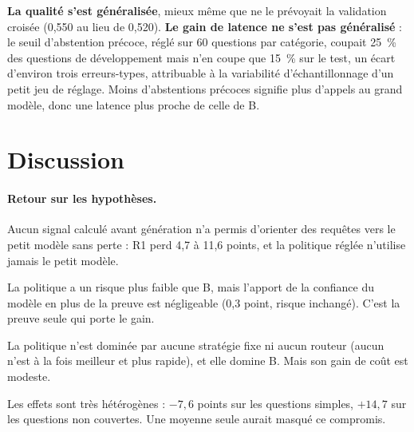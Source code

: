 \documentclass[11pt,a4paper]{article}
\begin{document}
\textbf{La qualité s'est généralisée}, mieux même que ne le prévoyait la validation croisée (0,550 au
lieu de 0,520). \textbf{Le gain de latence ne s'est pas généralisé} : le seuil d'abstention précoce,
réglé sur 60 questions par catégorie, coupait 25~\% des questions de développement mais n'en coupe que
15~\% sur le test, un écart d'environ trois erreurs-types, attribuable à la variabilité d'échantillonnage
d'un petit jeu de réglage. Moins d'abstentions précoces signifie plus d'appels au grand modèle, donc une
latence plus proche de celle de B.

\section{Discussion}\label{sec:discussion}

\paragraph{Retour sur les hypothèses.}
\begin{description}[style=sameline,leftmargin=1cm]
\item[H1 -- rejetée.] Aucun signal calculé avant génération n'a permis d'orienter des requêtes vers le
petit modèle sans perte : R1 perd 4,7 à 11,6 points, et la politique réglée n'utilise jamais le petit
modèle.
\item[H2 -- non confirmée.] La politique a un risque plus faible que B, mais l'apport de la confiance du
modèle en plus de la preuve est négligeable (0,3 point, risque inchangé). C'est la preuve seule qui
porte le gain.
\item[H3 -- partiellement confirmée.] La politique n'est dominée par aucune stratégie fixe ni aucun
routeur (aucun n'est à la fois meilleur et plus rapide), et elle domine B. Mais son gain de coût est
modeste.
\item[H4 -- confirmée.] Les effets sont très hétérogènes : $-7{,}6$ points sur les questions simples,
$+14{,}7$ sur les questions non couvertes. Une moyenne seule aurait masqué ce compromis.
\end{description}
\end{document}

